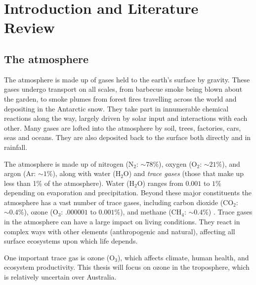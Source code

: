 \chapter{Introduction and Literature Review} %
\label{LR}

\section{The atmosphere}
\label{LR:Atmos}
  The atmosphere is made up of gases held to the earth's surface by gravity. 
  These gases undergo transport on all scales, from barbecue smoke being blown about the garden, to smoke plumes from forest fires travelling across the world and depositing in the Antarctic snow.
  They take part in innumerable chemical reactions along the way, largely driven by solar input and interactions with each other.
  Many gases are lofted into the atmosphere by soil, trees, factories, cars, seas and oceans.
  They are also deposited back to the surface both directly and in rainfall.
  
  The atmosphere is made up of nitrogen (N$_2$: $\sim 78\%$), oxygen (O$_2$: $\sim 21\%$), and argon (Ar: $\sim 1\%$), along with water (H$_2$O) and \textit{trace gases} (those that make up less than 1\% of the atmosphere).
  Water (H$_2$O) ranges from $0.001$ to $1\%$ depending on evaporation and precipitation.
  Beyond these major constituents the atmosphere has a vast number of trace gases, including carbon dioxide (CO$_2$: $\sim 0.4\%$), ozone (O$_3$: $.000001$ to $0.001\%$), and methane (CH$_4$: $\sim 0.4\%$) \parencite[][Ch. 2]{BrasseurJacob2017}.
  Trace gases in the atmosphere can have a large impact on living conditions.
  They react in complex ways with other elements (anthropogenic and natural), affecting all surface ecosystems upon which life depends.
  
  One important trace gas is ozone (O$_3$), which affects climate, human health, and ecosystem productivity.
  This thesis will focus on ozone in the troposphere, which is relatively uncertain over Australia.
  
